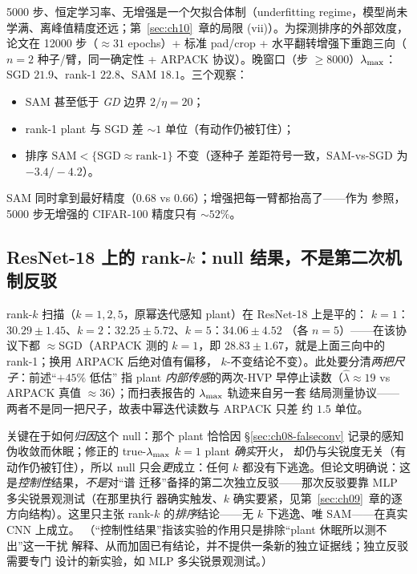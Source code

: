5000 步、恒定学习率、无增强是一个欠拟合体制（underfitting regime，模型尚未学满、离峰值精度还远；第~\ref{sec:ch10}~章的局限
(vii)）。为探测排序的外部效度，论文在 12000 步（${\approx}31$ epochs）+
标准 pad/crop + 水平翻转增强下重跑三向（$n=2$ 种子/臂，同一确定性 +
ARPACK 协议）。晚窗口（步 $\ge8000$）$\lambda_{\max}$：SGD $21.9$、rank-1
$22.8$、SAM $18.1$。三个观察：

\begin{itemize}
  \item SAM 甚至低于 \emph{GD} 边界 $2/\eta=20$；
  \item rank-1 plant 与 SGD 差 ${\sim}1$ 单位（有动作仍被钉住）；
  \item 排序 $\text{SAM}<\{\text{SGD}\approx\text{rank-1}\}$ 不变（逐种子
        差距符号一致，SAM-vs-SGD 为 $-3.4/-4.2$）。
\end{itemize}

SAM 同时拿到最好精度（$0.68$ vs $0.66$）；增强把每一臂都抬高了——作为
参照，5000 步无增强的 CIFAR-100 精度只有 ${\sim}52\%$。

\subsection{ResNet-18 上的 rank-$k$：null 结果，不是第二次机制反驳}\label{sec:ch08-rankk}

rank-$k$ 扫描（$k=1,2,5$，原幂迭代感知 plant）在 ResNet-18 上是平的：
$k=1$：$30.29\pm1.45$、$k=2$：$32.25\pm5.72$、$k=5$：$34.06\pm4.52$
（各 $n=5$）——在该协议下都 $\approx$SGD（ARPACK 测的 $k=1$，即
$28.83\pm1.67$，就是上面三向中的 rank-1；换用 ARPACK 后绝对值有偏移，
$k$-不变结论不变）。此处要分清\emph{两把尺子}：前述``$+45\%$ 低估''
指 plant \emph{内部传感}的两次-HVP 早停止读数（$\hat\lambda\approx19$
vs ARPACK 真值 $\approx36$）；而扫表报告的 $\lambda_{\max}$ 轨迹来自另一套
结局测量协议——两者不是同一把尺子，故表中幂迭代读数与 ARPACK 只差
约 $1.5$ 单位。

关键在于如何\emph{归因}这个 null：那个 plant 恰恰因 \S\ref{sec:ch08-falseconv}
记录的感知伪收敛而休眠；修正的 true-$\lambda_{\max}$ $k=1$ plant \emph{确实}开火，
却仍与尖锐度无关（有动作仍被钉住），所以 null 只会\emph{更}成立：任何
$k$ 都没有下逃逸。但论文明确说：这是\emph{控制性}结果，\emph{不是}对“谱
迁移”备择的第二次独立反驳——那次反驳要靠 MLP 多尖锐景观测试（在那里执行
器确实触发、$k$ 确实要紧，见第~\ref{sec:ch09}~章的逐方向结构）。这里只主张
rank-$k$ 的\emph{排序}结论——无 $k$ 下逃逸、唯 SAM——在真实 CNN 上成立。
（``控制性结果''指该实验的作用只是排除“plant 休眠所以测不出”这一干扰
解释、从而加固已有结论，并不提供一条新的独立证据线；独立反驳需要专门
设计的新实验，如 MLP 多尖锐景观测试。）

